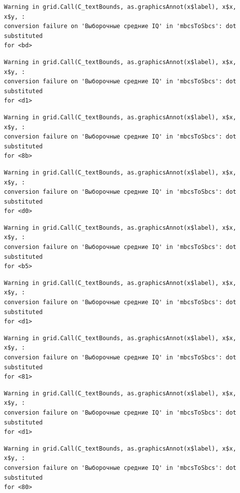 \documentclass[
  letterpaper,
]{scrbook}
\theoremstyle{definition}
\theoremstyle{remark}
\begin{document}
\begin{verbatim}
Warning in grid.Call(C_textBounds, as.graphicsAnnot(x$label), x$x, x$y, :
conversion failure on 'Выборочные средние IQ' in 'mbcsToSbcs': dot substituted
for <bd>
\end{verbatim}

\begin{verbatim}
Warning in grid.Call(C_textBounds, as.graphicsAnnot(x$label), x$x, x$y, :
conversion failure on 'Выборочные средние IQ' in 'mbcsToSbcs': dot substituted
for <d1>
\end{verbatim}

\begin{verbatim}
Warning in grid.Call(C_textBounds, as.graphicsAnnot(x$label), x$x, x$y, :
conversion failure on 'Выборочные средние IQ' in 'mbcsToSbcs': dot substituted
for <8b>
\end{verbatim}

\begin{verbatim}
Warning in grid.Call(C_textBounds, as.graphicsAnnot(x$label), x$x, x$y, :
conversion failure on 'Выборочные средние IQ' in 'mbcsToSbcs': dot substituted
for <d0>
\end{verbatim}

\begin{verbatim}
Warning in grid.Call(C_textBounds, as.graphicsAnnot(x$label), x$x, x$y, :
conversion failure on 'Выборочные средние IQ' in 'mbcsToSbcs': dot substituted
for <b5>
\end{verbatim}

\begin{verbatim}
Warning in grid.Call(C_textBounds, as.graphicsAnnot(x$label), x$x, x$y, :
conversion failure on 'Выборочные средние IQ' in 'mbcsToSbcs': dot substituted
for <d1>
\end{verbatim}

\begin{verbatim}
Warning in grid.Call(C_textBounds, as.graphicsAnnot(x$label), x$x, x$y, :
conversion failure on 'Выборочные средние IQ' in 'mbcsToSbcs': dot substituted
for <81>
\end{verbatim}

\begin{verbatim}
Warning in grid.Call(C_textBounds, as.graphicsAnnot(x$label), x$x, x$y, :
conversion failure on 'Выборочные средние IQ' in 'mbcsToSbcs': dot substituted
for <d1>
\end{verbatim}

\begin{verbatim}
Warning in grid.Call(C_textBounds, as.graphicsAnnot(x$label), x$x, x$y, :
conversion failure on 'Выборочные средние IQ' in 'mbcsToSbcs': dot substituted
for <80>
\end{verbatim}
\end{document}
